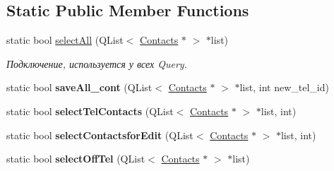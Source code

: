 \subsection*{Static Public Member Functions}
\begin{DoxyCompactItemize}
\item 
\mbox{\label{class_contacts_a24353f52b590030661d4713f2ce327f8}} 
static bool \mbox{\hyperlink{class_contacts_a24353f52b590030661d4713f2ce327f8}{select\+All}} (Q\+List$<$ \mbox{\hyperlink{class_contacts}{Contacts}} $\ast$ $>$ $\ast$list)
\begin{DoxyCompactList}\small\item\em Подключение, используется у всех Query. \end{DoxyCompactList}\item 
\mbox{\label{class_contacts_a322036950571188925b6f073ac912437}} 
static bool {\bfseries save\+All\+\_\+cont} (Q\+List$<$ \mbox{\hyperlink{class_contacts}{Contacts}} $\ast$ $>$ $\ast$list, int new\+\_\+tel\+\_\+id)
\item 
\mbox{\label{class_contacts_a6e78016fe22ed011eb9b2cfc02575fca}} 
static bool {\bfseries select\+Tel\+Contacts} (Q\+List$<$ \mbox{\hyperlink{class_contacts}{Contacts}} $\ast$ $>$ $\ast$list, int)
\item 
\mbox{\label{class_contacts_ab1f270b4fbbac8aa549a8e6c2a93f10b}} 
static bool {\bfseries select\+Contactsfor\+Edit} (Q\+List$<$ \mbox{\hyperlink{class_contacts}{Contacts}} $\ast$ $>$ $\ast$list, int)
\item 
\mbox{\label{class_contacts_ab6693247d064063c8bb7059fefaa50c3}} 
static bool {\bfseries select\+Off\+Tel} (Q\+List$<$ \mbox{\hyperlink{class_contacts}{Contacts}} $\ast$ $>$ $\ast$list)
\end{DoxyCompactItemize}
